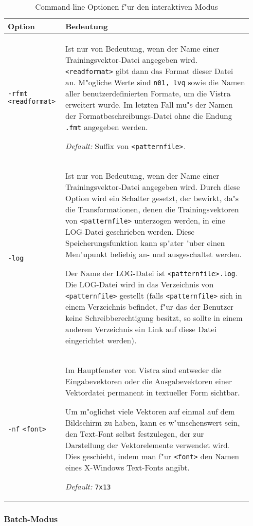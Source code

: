 \begin{table}[ht]
\begin{tabular}[t]{lp{10.5cm}}
{\bf Option} & {\bf Bedeutung} \\ \hline
{\tt -rfmt} {\tt <readformat>} & Ist nur von Bedeutung, wenn der Name einer
Trainingsvektor-Datei angegeben wird. 
{\tt <readformat>} gibt dann das Format dieser Datei an.
M"ogliche Werte sind {\tt n01, lvq} sowie die Namen aller benutzerdefinierten
Formate, um die Vistra erweitert wurde. 
Im letzten Fall mu"s der Namen der Formatbeschreibungs-Datei ohne die
Endung {\tt .fmt} angegeben werden. 
 
{\sl Default:} Suffix von {\tt <patternfile>}. \\
{\tt -log} & Ist nur von Bedeutung, wenn der Name einer Trainingsvektor-Datei
angegeben wird.
Durch diese Option wird ein Schalter gesetzt, der bewirkt, da"s die 
Transformationen, denen die Trainingsvektoren von {\tt <patternfile>}
unterzogen werden, in eine LOG-Datei geschrieben werden. 
Diese Speicherungsfunktion kann sp"ater "uber einen Men"upunkt beliebig
an- und ausgeschaltet werden. 

Der Name der LOG-Datei ist {\tt <patternfile>.log}.
Die LOG-Datei wird in das Verzeichnis von {\tt <patternfile>} gestellt
(falls {\tt <patternfile>} sich in einem Verzeichnis befindet, f"ur
das der Benutzer keine Schreibberechtigung besitzt, so sollte 
in einem anderen Verzeichnis ein Link auf diese Datei eingerichtet
werden). \\
{\tt -nf} {\tt <font>} & Im Hauptfenster von Vistra sind entweder
die Eingabevektoren oder die Ausgabevektoren einer Vektordatei permanent
in textueller Form sichtbar. 

Um m"oglichst viele Vektoren auf einmal auf dem Bildschirm zu haben, 
kann es w"unschenswert sein, den Text-Font selbst festzulegen, der zur 
Darstellung der Vektorelemente verwendet wird.
Dies geschieht, indem man f"ur {\tt <font>} den Namen eines
X-Windows Text-Fonts angibt. 

{\sl Default:} {\tt 7x13} \\
\end{tabular}
\caption{\label{interoptions} Command-line Optionen f"ur den interaktiven Modus}
\end{table}

\subsubsection*{Batch-Modus}

